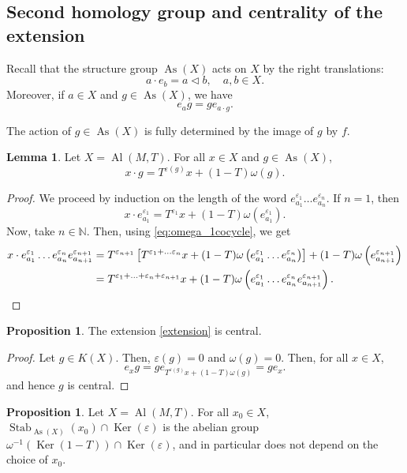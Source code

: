 \documentclass[a4paper,11pt]{amsart}
\theoremstyle{definition}
\newtheorem{lem}[thm]{Lemma}
\newtheorem{prop}[thm]{Proposition}
\newcommand{\N}{{\mathbb N}}
\DeclareMathOperator{\Ker}{Ker}
\DeclareMathOperator{\Stab}{Stab}
\DeclareMathOperator{\Al}{Al}
\DeclareMathOperator{\As}{As}
\begin{document}
\subsection{Second homology group and centrality of the extension}
Recall that the structure group $\As(X)$ acts on $X$ by the right translations:
\[
a \cdot e_b = a\lhd b,\quad a,b\in X.
\]
Moreover, if $a\in X$ and $g\in \As(X)$, we have
\[
e_a g = g e_{a\cdot g}.
\]

The action of $g\in \As(X)$ is fully determined by the image of $g$ by $f$.
\begin{lem}
Let $X=\Al(M,T)$.
For all $x\in X$ and $g\in \As(X)$,
\[
x\cdot g = T^{\varepsilon(g)} x + (1-T)\omega(g).
\]
\end{lem}

\begin{proof}
We proceed by induction on the length of the word $e_{a_1}^{\varepsilon_1} \ldots e_{a_n}^{\varepsilon_n}$.
If $n=1$, then
\[
x\cdot e_{a_1}^{\varepsilon_1} = T^{\varepsilon_1} x + (1-T) \omega\left(e_{a_1}^{\varepsilon_1}\right).
\]
Now, take $n\in \N$.
Then, using \cref{eq:omega_1cocycle}, we get
\begin{align*}
x\cdot e_{a_1}^{\varepsilon_1} \ldots e_{a_n}^{\varepsilon_n} e_{a_{n+1}}^{\varepsilon_{n+1}} 
& = T^{\varepsilon_{n+1}} \left[ T^{\varepsilon_1 +\ldots \varepsilon_n} x + (1-T) \omega\left(e_{a_1}^{\varepsilon_1} \ldots e_{a_n}^{\varepsilon_n}\right) \right] + (1-T) \omega\left(e_{a_{n+1}}^{\varepsilon_{n+1}}\right) \\
& = T^{\varepsilon_1 + \ldots + \varepsilon_n + \varepsilon_{n+1}}x + (1-T) \omega\left(e_{a_1}^{\varepsilon_1} \ldots e_{a_n}^{\varepsilon_n} e_{a_{n+1}}^{\varepsilon_{n+1}} \right). \qedhere
\end{align*}
\end{proof}

\begin{prop}
The extension \eqref{extension} is central.
\end{prop}

\begin{proof}
Let $g\in K(X)$.
Then, $\varepsilon(g)=0$ and $\omega(g)=0$.
Then, for all $x\in X$,
\[
e_x g = g e_{T^{\varepsilon(g)} x + (1-T)\omega(g)} = g e_x.
\]
and hence $g$ is central.
\end{proof}

\begin{prop}\label{stabker}
Let $X=\Al(M,T)$.
For all $x_0\in X$, $\Stab_{\As(X)} (x_0)\cap \Ker(\varepsilon)$ is the abelian group $\omega^{-1}(\Ker(1-T))\cap \Ker(\varepsilon)$, and in particular does not depend on the choice of $x_0$.
\end{prop}
\end{document}
